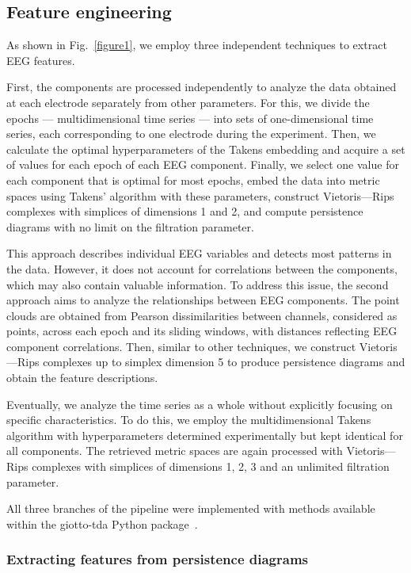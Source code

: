 \documentclass[pdflatex,sn-basic,Numbered]{sn-jnl}
\begin{document}
\subsection{Feature engineering}

As shown in Fig.~\ref{figure1}, we employ three independent techniques to extract EEG features.

First, the components are processed independently to analyze the data obtained at each electrode separately from other parameters. For this, we divide the epochs --- multidimensional time series --- into sets of one-dimensional time series, each corresponding to one electrode during the experiment. Then, we calculate the optimal hyperparameters of the Takens embedding and acquire a set of values for each epoch of each EEG component. Finally, we select one value for each component that is optimal for most epochs, embed the data into metric spaces using Takens' algorithm with these parameters, construct Vietoris---Rips complexes with simplices of dimensions 1 and 2, and compute persistence diagrams with no limit on the filtration parameter.

This approach describes individual EEG variables and detects most patterns in the data. However, it does not account for correlations between the components, which may also contain valuable information. To address this issue, the second approach aims to analyze the relationships between EEG components. The point clouds are obtained from Pearson dissimilarities between channels, considered as points, across each epoch and its sliding windows, with distances reflecting EEG component correlations. Then, similar to other techniques, we construct Vietoris---Rips complexes up to simplex dimension 5 to produce persistence diagrams and obtain the feature descriptions.\@

Eventually, we analyze the time series as a whole without explicitly focusing on specific characteristics. To do this, we employ the multidimensional Takens algorithm with hyperparameters determined experimentally but kept identical for all components. The retrieved metric spaces are again processed with Vietoris---Rips complexes with simplices of dimensions 1, 2, 3 and an unlimited filtration parameter.

All three branches of the pipeline were implemented with methods available within the giotto-tda Python package~\cite{tauzin2021giottotdatopologicaldataanalysis}.

\subsubsection{Extracting features from persistence diagrams}
\end{document}
